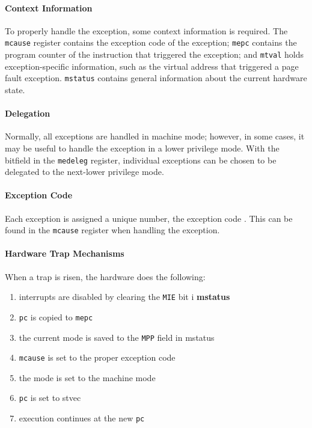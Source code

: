 
\paragraph{Context Information} To properly handle the exception, some context information is required.
The \texttt{mcause} register contains the exception code of the exception; \texttt{mepc} contains
the program counter of the instruction that triggered the exception; and \texttt{mtval} holds
exception-specific information, such as the virtual address that triggered a page fault exception.
\texttt{mstatus} contains general information about the current hardware state.

\paragraph{Delegation} Normally, all exceptions are handled in machine mode; however, in some cases,
it may be useful to handle the exception in a lower privilege mode. With the bitfield in the
\texttt{medeleg} register, individual exceptions can be chosen to be delegated to the next-lower
privilege mode.

\paragraph{Exception Code} Each exception is assigned a unique number, the exception code \cite{riscvreader}.
This can be found in the \texttt{mcause} register when handling the exception.



\paragraph{Hardware Trap Mechanisms} When a trap is risen, the hardware does the following: \cite{cox2011xv6}
\begin{enumerate}
    \item interrupts are disabled by clearing the \texttt{MIE} bit i    \textbf{mstatus}
    \item \texttt{pc} is copied to \texttt{mepc}
    \item the current mode is saved to the \texttt{MPP} field in mstatus
    \item \texttt{mcause} is set to the proper exception code
    \item the mode is set to the machine mode
    \item \texttt{pc} is set to stvec
    \item execution continues at the new \texttt{pc}
\end{enumerate}

